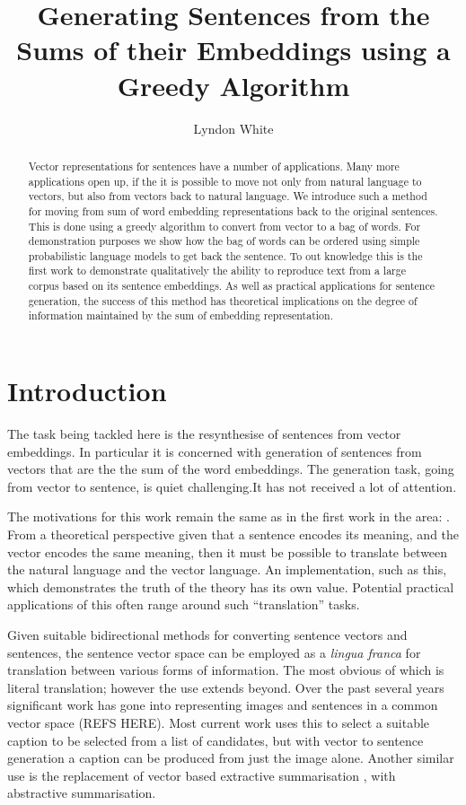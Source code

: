 \documentclass[11pt]{article}
\title{Generating Sentences from the Sums of their Embeddings using a Greedy Algorithm}
\author{Lyndon White}
\numberwithin{equation}{section}
\numberwithin{figure}{section}
\theoremstyle{plain}
\theoremstyle{definition}
\begin{document}
\maketitle

\begin{abstract}
Vector representations for sentences have a number of applications.
Many more applications open up, if the it is possible to move not only from natural language to vectors, but also from vectors back to natural language. We introduce such a method for moving from sum of word embedding representations back to the original sentences. This is done using a greedy algorithm to convert from vector to a bag of words. For demonstration purposes we show how the bag of words can be ordered using simple probabilistic language models to get back the sentence. To out knowledge this is the first work to demonstrate qualitatively the ability to reproduce text from a large corpus based on its sentence embeddings. 
As well as practical applications for sentence generation, the success of this method has theoretical implications on the degree of information maintained by the sum of embedding representation.

\end{abstract}

\section{Introduction} \label{intro}




The task being tackled here is the resynthesise of sentences from vector embeddings. In particular it is concerned with generation of sentences from vectors that are the the sum of the word embeddings. The generation task, going from vector to sentence, is quiet challenging.It has not received a lot of attention.

The motivations for this work remain the same as in the first work in the area: \textcite{Dinu2014CompositionalGeneration}. From a theoretical perspective given that a sentence encodes its meaning, and the vector encodes the same meaning, then it must be possible to translate between the natural language and the vector language. An implementation, such as this, which demonstrates the truth of the theory has its own value. Potential practical applications of this often range around such ``translation'' tasks.

Given suitable bidirectional methods for converting sentence vectors and sentences, the sentence vector space can be employed as a \emph{lingua franca} for translation between various forms of information. The most obvious of which is literal translation; however the use extends beyond. Over the past several years significant work has gone into representing images and sentences in a common vector space (REFS HERE). Most current work uses this to select a suitable caption to be selected from a list of candidates, but with vector to sentence generation a caption can be produced from just the image alone. Another similar use is the replacement of vector based extractive summarisation \textcite{KaagebExtractiveSummaristation,yogatamaextractive}, with abstractive summarisation.
\end{document}
